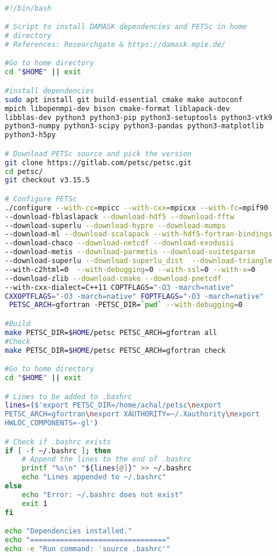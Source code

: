 \begin{lstlisting}[language=bash, basicstyle=\small\ttfamily, frame=single]

#!/bin/bash

# Script to install DAMASK dependencies and PETSc in home 
# directory
# References: Researchgate & https://damask.mpie.de/

#Go to home directory
cd "$HOME" || exit

#install dependencies
sudo apt install git build-essential cmake make autoconf 
mpich libopenmpi-dev bison cmake-format liblapack-dev 
libblas-dev python3 python3-pip python3-setuptools python3-vtk9 
python3-numpy python3-scipy python3-pandas python3-matplotlib 
python3-h5py

# Download PETSc source and pick the version
git clone https://gitlab.com/petsc/petsc.git
cd petsc/
git checkout v3.15.5

# Configure PETSc
./configure --with-cc=mpicc --with-cxx=mpicxx --with-fc=mpif90
--download-fblaslapack --download-hdf5 --download-fftw 
--download-superlu --download-hypre --download-mumps 
--download-ml --download-scalapack --with-hdf5-fortran-bindings 
--download-chaco --download-netcdf --download-exodusii 
--download-metis --download-parmetis --download-suitesparse 
--download-superlu --download-superlu_dist  --download-triangle 
--with-c2html=0  --with-debugging=0 --with-ssl=0 --with-x=0 
--download-zlib --download-cmake --download-pnetcdf 
--with-cxx-dialect=C++11 COPTFLAGS="-O3 -march=native" 
CXXOPTFLAGS="-O3 -march=native" FOPTFLAGS="-O3 -march=native"
 PETSC_ARCH=gfortran -PETSC_DIR=`pwd` --with-debugging=0

#Build
make PETSC_DIR=$HOME/petsc PETSC_ARCH=gfortran all
#Check
make PETSC_DIR=$HOME/petsc PETSC_ARCH=gfortran check

#Go to home directory
cd "$HOME" || exit

# Lines to be added to .bashrc
lines=($'export PETSC_DIR=/home/achal/petsc\nexport
PETSC_ARCH=gfortran\nexport XAUTHORITY=~/.Xauthority\nexport
HWLOC_COMPONENTS=-gl')

# Check if .bashrc exists
if [ -f ~/.bashrc ]; then
    # Append the lines to the end of .bashrc
    printf "%s\n" "${lines[@]}" >> ~/.bashrc
    echo "Lines appended to ~/.bashrc"
else
    echo "Error: ~/.bashrc does not exist"
    exit 1
fi

echo "Dependencies installed."
echo "================================"
echo -e "Run command: 'source .bashrc'"

\end{lstlisting}

